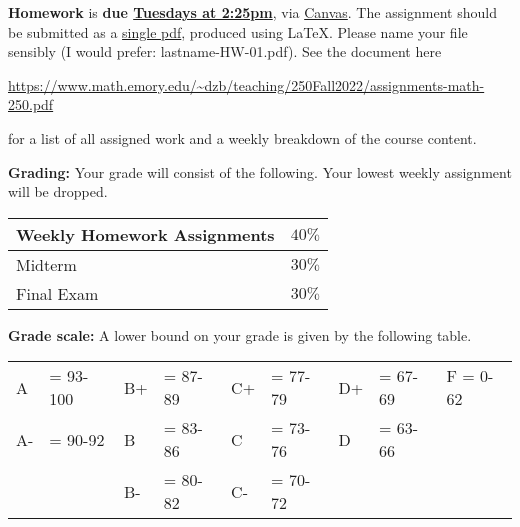 \documentclass[12pt]{article}
\begin{document}
\noindent \textbf{Homework} is \textbf{due \underline{Tuesdays at 2:25pm}}, via \underline{Canvas}. The assignment should be submitted as a \underline{single pdf}, produced using \LaTeX. Please name your file sensibly (I would prefer: lastname-HW-01.pdf).
See the document here
\begin{center}
  \url{https://www.math.emory.edu/~dzb/teaching/250Fall2022/assignments-math-250.pdf}
\end{center}
for a list of all assigned work and a weekly breakdown of the course content.






\noindent\textbf{Grading:} 
Your grade will consist of the following. Your lowest weekly assignment will be dropped.

\begin{center}
  \begin{tabular}{|l|l|}
    \hline
    Weekly Homework Assignments & $40\%$ \\
    \hline
    Midterm & $30\%$ \\     
    Final Exam & $30\%$ 	 \\
    \hline
  \end{tabular}
\end{center}


\vspace*{.15in}
\noindent\textbf{Grade scale:} 
A lower bound on your grade is given by the following table. 

\begin{center}
  \begin{tabular}{|ll|ll|ll|ll|l|}
\hline
A  &\hspace{-3 pt}\hspace{-7 pt}= 93-100   &B+ &\hspace{-7 pt}= 87-89  &C+ &\hspace{-7 pt}= 77-79 & D+ &\hspace{-7 pt}= 67-69  & F = 0-62\\
A- &\hspace{-3 pt}\hspace{-7 pt}= 90-92    &B  &\hspace{-7 pt}= 83-86  & C &\hspace{-7 pt}= 73-76  & D  &\hspace{-7 pt}= 63-66 &\\
   &                         &B- &\hspace{-7 pt}= 80-82  &C- &\hspace{-7 pt}= 70-72 &    &        &\\
    \hline
  \end{tabular}
\end{center}
\end{document}
